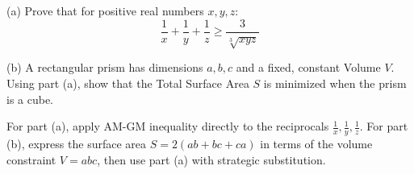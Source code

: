 
\begin{problem}
(a) Prove that for positive real numbers $x, y, z$:
\[ \frac{1}{x} + \frac{1}{y} + \frac{1}{z} \ge \frac{3}{\sqrt[3]{xyz}} \]

(b) A rectangular prism has dimensions $a, b, c$ and a fixed, constant Volume $V$.
Using part (a), show that the Total Surface Area $S$ is minimized when the prism is a cube.

\vspace{1cm}

\begin{center}
\end{center}
\end{problem}

\begin{hint}
For part (a), apply AM-GM inequality directly to the reciprocals $\frac{1}{x}, \frac{1}{y}, \frac{1}{z}$. For part (b), express the surface area $S = 2(ab + bc + ca)$ in terms of the volume constraint $V = abc$, then use part (a) with strategic substitution.
\end{hint}


